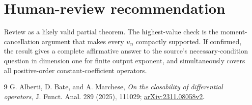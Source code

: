 \documentclass[11pt]{article}
\begin{document}
\section{Human-review recommendation}

Review as a likely valid partial theorem.  The highest-value check is the
moment-cancellation argument that makes every $u_n$ compactly supported.  If
confirmed, the result gives a complete affirmative answer to the source's
necessary-condition question in dimension one for finite output exponent, and
simultaneously covers all positive-order constant-coefficient operators.

\begin{thebibliography}{9}
G. Alberti, D. Bate, and A. Marchese,
\emph{On the closability of differential operators},
J. Funct. Anal. 289 (2025), 111029;
\href{https://arxiv.org/abs/2311.08058}{arXiv:2311.08058v2}.
\end{thebibliography}
\end{document}

